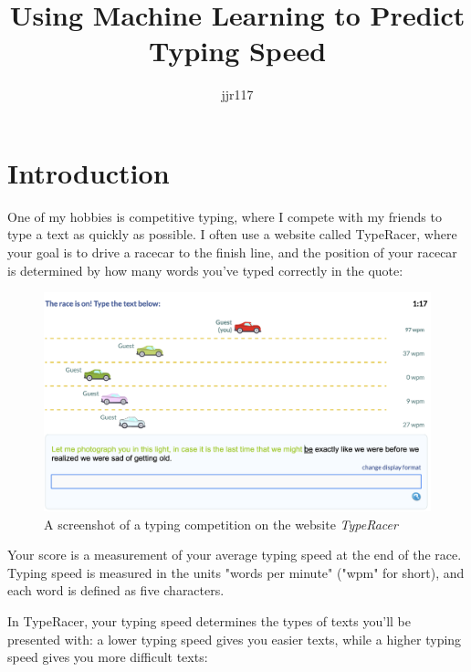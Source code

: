 \documentclass[12pt, demo]{article}
\title{Using Machine Learning to Predict Typing Speed}
\author{jjr117}
\date{}
\begin{document}
\maketitle

\section*{Introduction}

One of my hobbies is competitive typing, where I compete with my friends to type a text as quickly as possible. I often use a website called TypeRacer, where your goal is to drive a racecar to the finish line, and the position of your racecar is determined by how many words you've typed correctly in the quote:

\begin{figure}[H]
	\caption{A screenshot of a typing competition on the website \textit{TypeRacer}}
	\includegraphics[width=\textwidth]{typeracer.png}
\end{figure}

Your score is a measurement of your average typing speed at the end of the race. Typing speed is measured in the units "words per minute" ("wpm" for short), and each word is defined as five characters.

In TypeRacer, your typing speed determines the types of texts you'll be presented with: a lower typing speed gives you easier texts, while a higher typing speed gives you more difficult texts:
\end{document}
